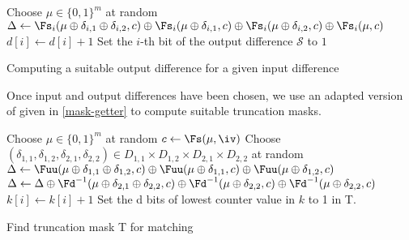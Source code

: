   \begin{algorithm}[htb]
        \LinesNumbered
    {
      Choose $\mu \in \{0,1\}^m$ at random\;
      $\Delta \leftarrow \Fs_i (\mu \oplus \delta_{i,1} \oplus \delta_{i,2} , c) \oplus \Fs_i (\mu \oplus \delta_{i,1} , c) \oplus
      \Fs_i(\mu \oplus \delta_{i,2},c) \oplus \Fs_i (\mu,c)$\;
      {
        {
          $d[i] \leftarrow d[i] + 1$\;
        }
      }
    }
    {
      {
        Set the $i$-th bit of the output difference $\mathcal{S}$ to $1$\;
      }
    }
    \caption{\label{difference-getter}Computing a suitable output difference for a given input difference}
  \end{algorithm}

  Once input and output differences have been chosen, we use an adapted version of \cite[Algorithm~2]{DBLP:conf/crypto/KnellwolfK12} given in
  \autoref{mask-getter} to compute suitable truncation masks. 

  \begin{algorithm}[ht]
        \LinesNumbered

    {
      Choose $\mu \in \{0,1\}^m$ at random \;
      $c \leftarrow \Fs(\mu, \iv)$\;
      Choose $(\delta_{1,1},\delta_{1,2},\delta_{2,1},\delta_{2,2}) \in D_{1,1} \times D_{1,2} \times D_{2,1} \times D_{2,2} $ at random\; 
      $\Delta \leftarrow 
      \Fuu (\mu \oplus \delta_{1,1} \oplus \delta_{1,2} , c) \oplus 
      \Fuu (\mu \oplus \delta_{1,1} , c) \oplus 
      \Fuu(\mu \oplus \delta_{1,2},c)$\;
      $\Delta \leftarrow \Delta \oplus
      \Fd^{-1} (\mu \oplus \delta_{2,1} \oplus \delta_{2,2}, c) \oplus 
      \Fd^{-1}(\mu \oplus \delta_{2,2} , c) \oplus 
      \Fd^{-1} (\mu \oplus \delta_{2,2} , c) $\;
      {
        {
          $k[i] \leftarrow k[i] + 1$\;
        }
      }
    }
    Set the d bits of lowest counter value in $k$ to 1 in T.
    \caption{\label{mask-getter}Find truncation mask T for matching}
  \end{algorithm}


